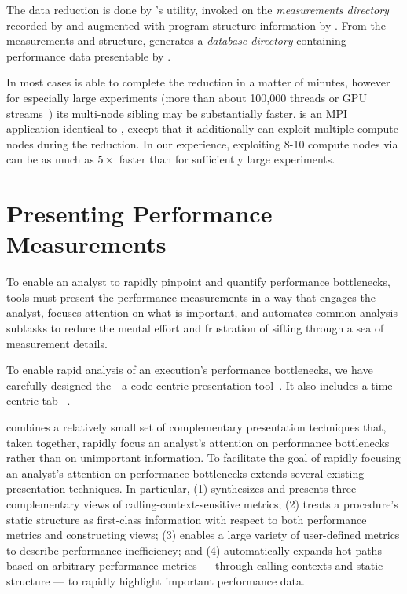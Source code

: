\documentclass[11pt,twoside,letterpaper]{report}
\begin{document}
The data reduction is done by \HPCToolkit's \hpcprof{} utility, invoked on the \emph{measurements directory} recorded by \hpcrun{} and augmented with program structure information by \hpcstruct{}.
From the measurements and structure, \hpcprof{} generates a \emph{database directory} containing performance data presentable by \hpcviewer{}.

In most cases \hpcprof{} is able to complete the reduction in a matter of minutes, however for especially large experiments (more than about 100,000 threads or GPU streams~\cite{10.1145/3524059.3532397}) its multi-node sibling \hpcprofmpi{} may be substantially faster.
\hpcprofmpi{} is an MPI application identical to \hpcprof{}, except that it additionally can exploit multiple compute nodes during the reduction.
In our experience, exploiting 8-10 compute nodes via \hpcprofmpi{} can be as much as $5\times$ faster than \hpcprof{} for sufficiently large experiments.

\section{Presenting Performance Measurements}

To enable an analyst to rapidly pinpoint and quantify performance bottlenecks, tools must present the performance measurements in a way that engages the analyst, focuses attention on what is important, and automates common analysis subtasks to reduce the mental effort and frustration of sifting through a sea of measurement details.

To enable rapid analysis of an execution's performance bottlenecks, we have carefully designed the \hpcviewer{}
- a code-centric presentation tool~\cite{Adhianto-MC-Ta:2010:PSTI-hpcviewer}.  It also includes a time-centric tab
~\cite{Tallent-MC-etal:2011:ICS-hpctoolkit-scalable-tracing}.

\hpcviewer{} combines a relatively small set of complementary presentation techniques that, taken together, rapidly focus an analyst's attention on performance bottlenecks rather than on unimportant information.
To facilitate the goal of rapidly focusing an analyst's attention on performance bottlenecks \hpcviewer{}
extends several existing presentation techniques.
In particular, \hpcviewer{} (1) synthesizes and presents three complementary views of calling-context-sensitive metrics;
(2) treats a procedure's static structure as first-class information with respect to both performance metrics
and constructing views; (3) enables a large variety of user-defined metrics to describe performance inefficiency;
and (4) automatically expands hot paths based on arbitrary performance metrics --- through calling contexts and static structure --- to rapidly highlight important performance data.
\end{document}
